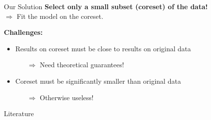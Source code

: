 \documentclass[gray]{beamer}
\begin{document}
\begin{frame}{Our Solution}
    \textbf{Select only a small subset (coreset) of the data!} \\
    $\Rightarrow$ Fit the model on the coreset.

    \vspace{\fill}

    \textbf{Challenges:}
    \begin{itemize}
        \item Results on coreset must be close to results on original data
              \begin{itemize}
                  \item[$\Rightarrow$] Need theoretical guarantees!
              \end{itemize}
        \item Coreset must be significantly smaller than original data
              \begin{itemize}
                  \item[$\Rightarrow$] Otherwise useless!
              \end{itemize}
    \end{itemize}
\end{frame}

\begin{frame}{Literature}
    \nocite{*}
    
    
\end{frame}
\end{document}
